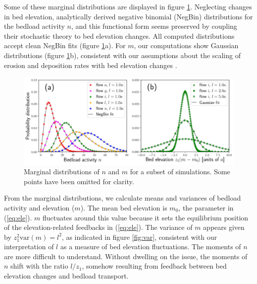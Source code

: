 \documentclass[draft]{agujournal2018}
\begin{document}
Some of these marginal distributions are displayed in figure \ref{fig:pdfs}.
Neglecting changes in bed elevation, \citet{Ancey2008} analytically derived negative binomial (NegBin) distributions for the bedload activity $n$, and this functional form seems preserved by coupling their stochastic theory to bed elevation changes. 
All computed distributions accept clean NegBin fits (figure \ref{fig:pdfs}a).
For $m$, our computations show Gaussian distributions (figure \ref{fig:pdfs}b), consistent with our assumptions about the scaling of erosion and deposition rates with bed elevation changes \citep[e.g.][]{Wong2007}.

\begin{figure}[t!]
	\includegraphics[width=\linewidth,keepaspectratio]{./figures/montage2.pdf}
	\caption{Marginal distributions of $n$ and $m$ for a subset of simulations. Some points have been omitted for clarity.}
	\label{fig:pdfs}
\end{figure}



From the marginal distributions, we calculate means and variances of bedload activity and elevation ($m$).
The mean bed elevation is $m_0$, the parameter in (\ref{eq:ele}). $m$ fluctuates around this value because it sets the equilibrium position of the elevation-related feedbacks in (\ref{eq:ele}).
The variance of $m$ appears given by $z_1^2 \text{var}(m) = l^2$, as indicated in figure \ref{fig:var}, consistent with our interpretation of $l$ as a measure of bed elevation fluctuations.
The moments of $n$ are more difficult to understand.
Without dwelling on the issue, the moments of $n$ shift with the ratio $l/z_1$, somehow resulting from feedback between bed elevation changes and bedload transport.
\end{document}

